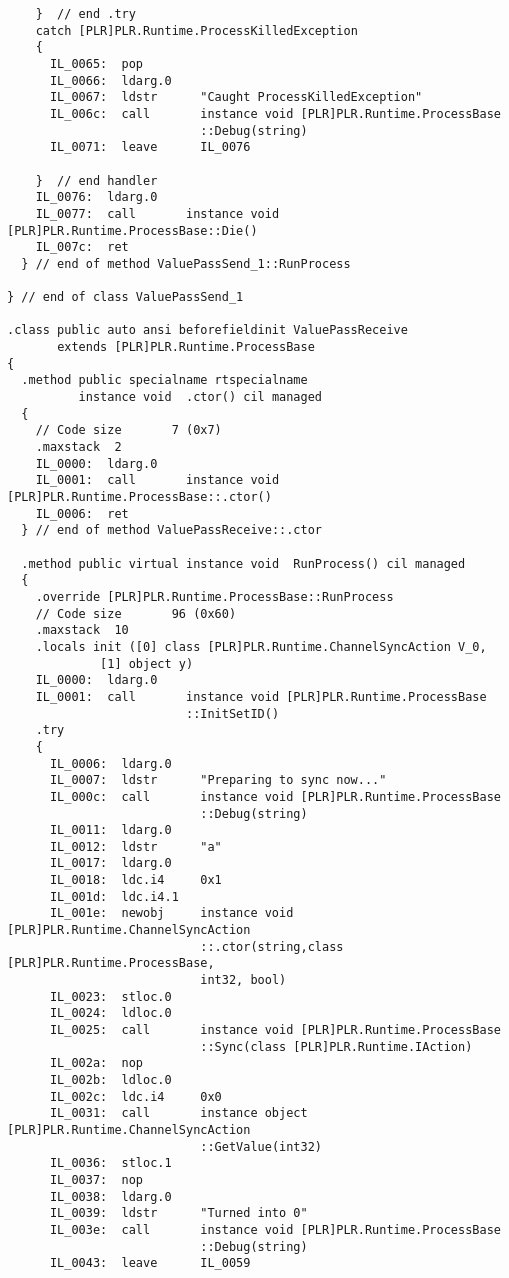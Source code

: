 \begin{lstlisting}
    }  // end .try
    catch [PLR]PLR.Runtime.ProcessKilledException 
    {
      IL_0065:  pop
      IL_0066:  ldarg.0
      IL_0067:  ldstr      "Caught ProcessKilledException"
      IL_006c:  call       instance void [PLR]PLR.Runtime.ProcessBase
                           ::Debug(string)
      IL_0071:  leave      IL_0076

    }  // end handler
    IL_0076:  ldarg.0
    IL_0077:  call       instance void [PLR]PLR.Runtime.ProcessBase::Die()
    IL_007c:  ret
  } // end of method ValuePassSend_1::RunProcess

} // end of class ValuePassSend_1

.class public auto ansi beforefieldinit ValuePassReceive
       extends [PLR]PLR.Runtime.ProcessBase
{
  .method public specialname rtspecialname 
          instance void  .ctor() cil managed
  {
    // Code size       7 (0x7)
    .maxstack  2
    IL_0000:  ldarg.0
    IL_0001:  call       instance void [PLR]PLR.Runtime.ProcessBase::.ctor()
    IL_0006:  ret
  } // end of method ValuePassReceive::.ctor

  .method public virtual instance void  RunProcess() cil managed
  {
    .override [PLR]PLR.Runtime.ProcessBase::RunProcess
    // Code size       96 (0x60)
    .maxstack  10
    .locals init ([0] class [PLR]PLR.Runtime.ChannelSyncAction V_0,
             [1] object y)
    IL_0000:  ldarg.0
    IL_0001:  call       instance void [PLR]PLR.Runtime.ProcessBase
                         ::InitSetID()
    .try
    {
      IL_0006:  ldarg.0
      IL_0007:  ldstr      "Preparing to sync now..."
      IL_000c:  call       instance void [PLR]PLR.Runtime.ProcessBase
                           ::Debug(string)
      IL_0011:  ldarg.0
      IL_0012:  ldstr      "a"
      IL_0017:  ldarg.0
      IL_0018:  ldc.i4     0x1
      IL_001d:  ldc.i4.1
      IL_001e:  newobj     instance void [PLR]PLR.Runtime.ChannelSyncAction
                           ::.ctor(string,class [PLR]PLR.Runtime.ProcessBase,
                           int32, bool)
      IL_0023:  stloc.0
      IL_0024:  ldloc.0
      IL_0025:  call       instance void [PLR]PLR.Runtime.ProcessBase
                           ::Sync(class [PLR]PLR.Runtime.IAction)
      IL_002a:  nop
      IL_002b:  ldloc.0
      IL_002c:  ldc.i4     0x0
      IL_0031:  call       instance object [PLR]PLR.Runtime.ChannelSyncAction
                           ::GetValue(int32)
      IL_0036:  stloc.1
      IL_0037:  nop
      IL_0038:  ldarg.0
      IL_0039:  ldstr      "Turned into 0"
      IL_003e:  call       instance void [PLR]PLR.Runtime.ProcessBase
                           ::Debug(string)
      IL_0043:  leave      IL_0059


\end{lstlisting}
